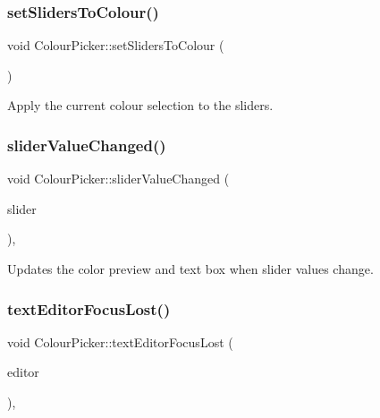\subsubsection{\texorpdfstring{set\+Sliders\+To\+Colour()}{setSlidersToColour()}}
{\footnotesize\ttfamily void Colour\+Picker\+::set\+Sliders\+To\+Colour (\begin{DoxyParamCaption}{ }\end{DoxyParamCaption})\hspace{0.3cm}{\ttfamily [protected]}}

Apply the current colour selection to the sliders. \mbox{\label{classColourPicker_a85d862565ab5e61870ab9b050ece7bf0}} 
\subsubsection{\texorpdfstring{slider\+Value\+Changed()}{sliderValueChanged()}}
{\footnotesize\ttfamily void Colour\+Picker\+::slider\+Value\+Changed (\begin{DoxyParamCaption}\item[{Slider $\ast$}]{slider }\end{DoxyParamCaption})\hspace{0.3cm}{\ttfamily [override]}, {\ttfamily [protected]}}

Updates the color preview and text box when slider values change. \mbox{\label{classColourPicker_a4d8a73a1d31692df09192e27a9d32ac7}} 
\subsubsection{\texorpdfstring{text\+Editor\+Focus\+Lost()}{textEditorFocusLost()}}
{\footnotesize\ttfamily void Colour\+Picker\+::text\+Editor\+Focus\+Lost (\begin{DoxyParamCaption}\item[{Text\+Editor \&}]{editor }\end{DoxyParamCaption})\hspace{0.3cm}{\ttfamily [override]}, {\ttfamily [protected]}}

